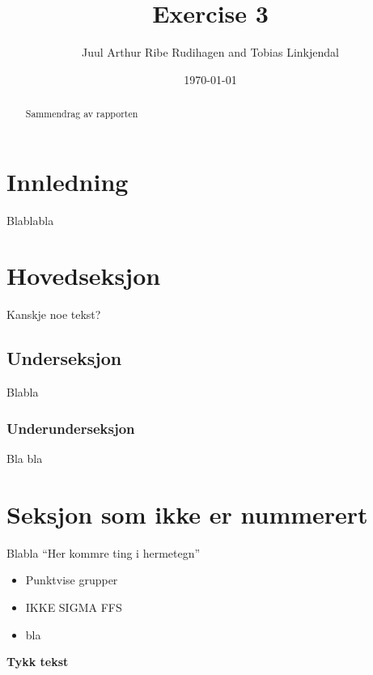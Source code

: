 \documentclass[titlepage]{article}
\author{Juul Arthur Ribe Rudihagen and Tobias Linkjendal}
\title{Exercise 3}
\date{\today}
\begin{document}
\maketitle

\renewcommand{\abstractname}{Summary}
\begin{abstract}
Sammendrag av rapporten
\end{abstract}

\tableofcontents

\newpage


\section{Innledning}
Blablabla

\newpage

\section{Hovedseksjon}
Kanskje noe tekst?

\subsection{Underseksjon}
Blabla

\subsubsection{Underunderseksjon}
Bla bla

\newpage

\section*{Seksjon som ikke er nummerert}
Blabla
``Her kommre ting i hermetegn'' %
\begin{itemize}
\item Punktvise grupper
\item IKKE SIGMA FFS%
\item bla
\end{itemize}
\textbf{Tykk tekst}
\end{document}
